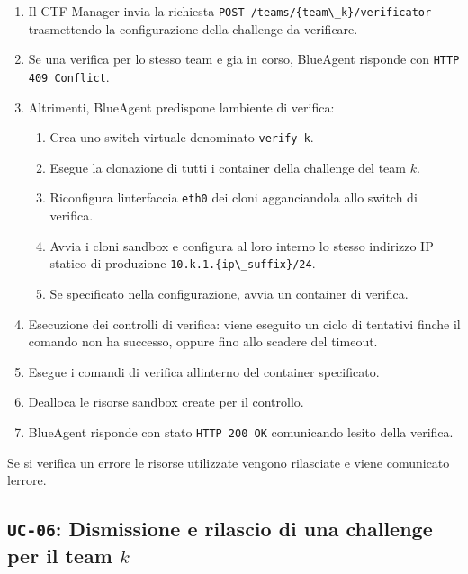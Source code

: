 \begin{enumerate}
\def\labelenumi{\arabic{enumi}.}
\tightlist
\item
  Il CTF Manager invia la richiesta
  \passthrough{\lstinline!POST /teams/\{team\_k\}/verificator!}
  trasmettendo la configurazione della challenge da verificare.
\item
  Se una verifica per lo stesso team e\textquotesingle{} gia in corso,
  BlueAgent risponde con \passthrough{\lstinline!HTTP 409 Conflict!}.
\item
  Altrimenti, BlueAgent predispone l\textquotesingle ambiente di
  verifica:

  \begin{enumerate}
  \def\labelenumii{\arabic{enumii}.}
  \tightlist
  \item
    Crea uno switch virtuale denominato
    \passthrough{\lstinline!verify-k!}.
  \item
    Esegue la clonazione di tutti i container della challenge del team
    \(k\).
  \item
    Riconfigura l\textquotesingle interfaccia
    \passthrough{\lstinline!eth0!} dei cloni agganciandola allo switch
    di verifica.
  \item
    Avvia i cloni sandbox e configura al loro interno lo stesso
    indirizzo IP statico di produzione
    \passthrough{\lstinline!10.k.1.\{ip\_suffix\}/24!}.
  \item
    Se specificato nella configurazione, avvia un container di verifica.
  \end{enumerate}
\item
  Esecuzione dei controlli di verifica: viene eseguito un ciclo di
  tentativi finche\textquotesingle{} il comando non ha successo, oppure
  fino allo scadere del timeout.
\item
  Esegue i comandi di verifica all\textquotesingle interno del container
  specificato.
\item
  Dealloca le risorse sandbox create per il controllo.
\item
  BlueAgent risponde con stato \passthrough{\lstinline!HTTP 200 OK!}
  comunicando l\textquotesingle esito della verifica.
\end{enumerate}

Se si verifica un errore le risorse utilizzate vengono rilasciate e
viene comunicato l\textquotesingle errore.

\subsection{\texorpdfstring{\texttt{UC-06}: Dismissione e rilascio di
una challenge per il team
\(k\)}{UC-06: Dismissione e rilascio di una challenge per il team k}}\label{uc-06-dismissione-e-rilascio-di-una-challenge-per-il-team-k}

